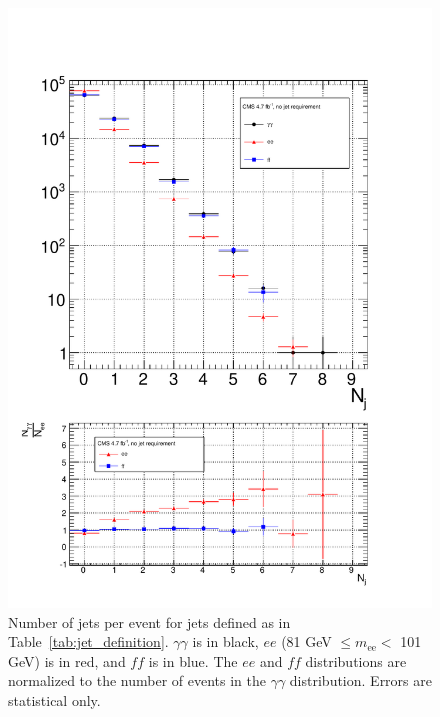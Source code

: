 \documentclass[dissertation.tex]{subfiles}
\begin{document}
\begin{figure}
	\centering
	\includegraphics[scale=0.5]{hadronic_activity_Nj}
	\caption{Number of jets per event for jets defined as in Table~\ref{tab:jet_definition}.  $\gamma\gamma$ is in black, $ee$ (81 GeV $\leq m_{\mathrm{ee}} <$ 101 GeV) is in red, and $\mathit{ff}$ is in blue.  The $ee$ and $\mathit{ff}$ distributions are normalized to the number of events in the $\gamma\gamma$ distribution.  Errors are statistical only.}
	\label{fig:hadronic_activity_Nj}
\end{figure}
\end{document}
